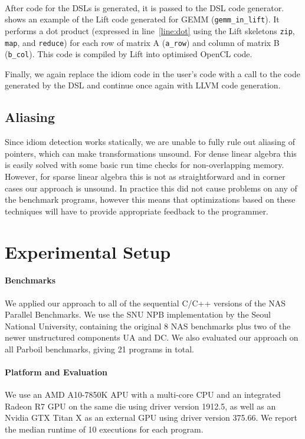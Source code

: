 \paragraph*{}
After code for the DSLs is generated, it is passed to the DSL code generator.
 shows an example of the Lift code generated for GEMM (\texttt{gemm\_in\_lift}).
It performs a dot product (expressed in line~\ref{line:dot} using the Lift skeletons \texttt{zip}, \texttt{map}, and \texttt{reduce}) for each row of matrix A (\texttt{a\_row}) and column of matrix B (\texttt{b\_col}).
This code is compiled by Lift into optimised OpenCL code.

Finally, we again replace the idiom code in the user's code with a call to the code generated by the DSL and continue once again with LLVM code generation.

\subsection{Aliasing}

    Since idiom detection works statically, we are unable to fully rule out
    aliasing of pointers, which can make transformations unsound.
    For dense linear algebra this is easily solved with some basic run time
    checks for non-overlapping memory.
    However, for sparse linear algebra this is not as straightforward and in
    corner cases our approach is unsound.
    In practice this did not cause problems on any of the benchmark programs,
    however this means that optimizations based on these techniques will have to
    provide appropriate feedback to the programmer.

\section{Experimental Setup}

    \paragraph*{Benchmarks}
    We applied our approach to all of the sequential C/C++ versions of the NAS
    Parallel Benchmarks.
    We use the SNU NPB implementation by the Seoul National University,
    containing the original 8 NAS benchmarks plus two of the newer unstructured
    components UA and DC.
    We also evaluated our approach on all Parboil benchmarks, giving 21 programs
    in total. 

    \paragraph*{Platform and Evaluation}
    We use an AMD A10-7850K APU with a multi-core CPU and an integrated Radeon
    R7 GPU on the same die using driver version 1912.5, as well as an Nvidia GTX
    Titan X as an external GPU using driver version 375.66.
    We report the median runtime of 10 executions for each program.

